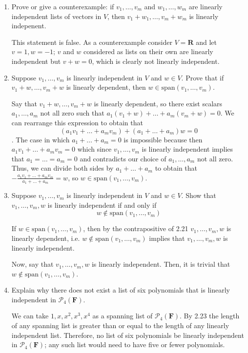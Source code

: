 \documentclass{book}
\begin{document}
\begin{enumerate}
\item Prove or give a counterexample: if \(v_1,\dots,v_m\) and \(w_1,\dots,w_m\) are linearly independent lists of vectors in \(V\), then \(v_1+w_1,\dots,v_m+w_m\) is linearly indepenent.

This statement is false.  As a counterexample consider \(V=\textbf{R}\) and let \(v=1,w=-1\); \(v\) and \(w\) considered as lists on their own are linearly independent but \(v+w=0\), which is clearly not linearly independent.

\item Suppose \(v_1,\dots,v_m\) is linearly independent in \(V\) and \(w \in V\).  Prove that if \(v_1+w,\dots,v_m+w\) is linearly dependent, then \(w \in \textrm{span}(v_1,\dots,v_m)\).

Say that \(v_1+w,\dots,v_m+w\) is linearly dependent, so there exist scalars \(a_1,\dots,a_m\) not all zero such that \(a_1(v_1+w)+\dots+a_m(v_m+w)=0\).  We can rearrange this expression to obtain that \[(a_1v_1+\dots+a_mv_m)+(a_1+\dots+a_m)w=0\].  The case in which \(a_1+\dots+a_m = 0\) is impossible because then \(a_1v_1+\dots+a_mv_m=0\) which since \(v_1,\dots,v_m\) is linearly independent implies that \(a_1=\dots=a_m=0\) and contradicts our choice of \(a_1,\dots,a_m\) not all zero.  Thus, we can divide both sides by \(a_1+\dots+a_m\) to obtain that \(-\frac{a_1v_1+\dots+a_mv_m}{a_1+\dots+a_m}=w\), so \(w \in \textrm{span}(v_1,\dots,v_m)\).

\item Suppose \(v_1,\dots,v_m\) is linearly independent in \(V\) and \(w \in V\).  Show that \(v_1,\dots,v_m,w\) is linearly independent if and only if \[w \notin \textrm{span}(v_1,\dots,v_m)\]

If \(w \in \textrm{span}(v_1,\dots,v_m)\), then by the contrapositive of 2.21 \(v_1,\dots,v_m,w\) is linearly dependent, i.e. \(w \notin \textrm{span}(v_1,\dots,v_m)\) implies that \(v_1,\dots,v_m,w\) is linearly independent.

Now, say that \(v_1,\dots,v_m,w\) is linearly independent.  Then, it is trivial that \(w \notin \textrm{span}(v_1,\dots,v_m)\).

\item Explain why there does not exist a list of six polynomials that is linearly independent in \(\mathcal{P}_4(\textbf{F})\).

We can take \(1,x,x^2,x^3,x^4\) as a spanning list of \(\mathcal{P}_4(\textbf{F})\).  By 2.23 the length of any spanning list is greater than or equal to the length of any linearly independent list.  Therefore, no list of six polynomials be linearly independent in \(\mathcal{P}_4(\textbf{F})\); any such list would need to have five or fewer polynomials.


\end{enumerate}
\end{document}
